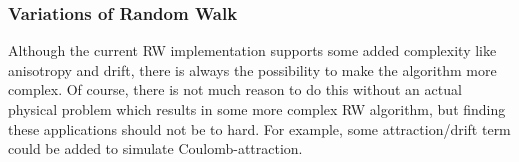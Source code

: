 \subsubsection{Variations of Random Walk}
Although the current RW implementation supports some added complexity like anisotropy and drift, there is always the possibility to make the algorithm more complex. 
Of course, there is not much reason to do this without an actual physical problem which results in some more complex RW algorithm, but finding these applications should not be to hard. 
For example, some attraction/drift term could be added to simulate Coulomb-attraction.

